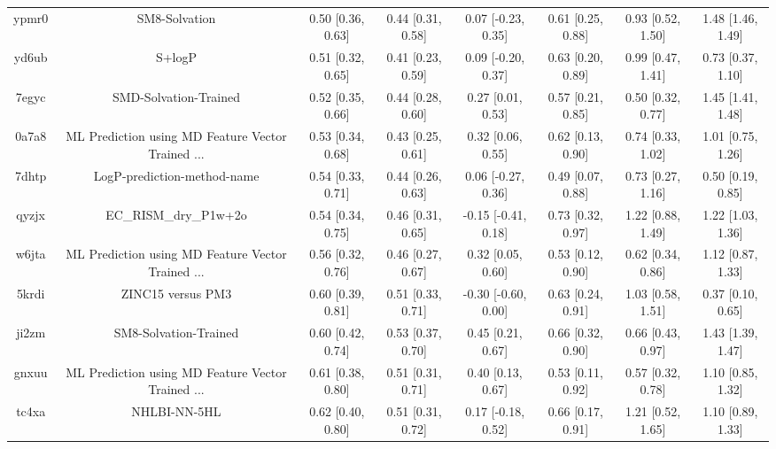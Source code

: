 \documentclass{article}
\begin{document}
\begin{center}
\begin{longtable}{|cccccccc|}
 ypmr0 &                                      SM8-Solvation &  0.50 [0.36, 0.63] &  0.44 [0.31, 0.58] &    0.07 [-0.23, 0.35] &  0.61 [0.25, 0.88] &    0.93 [0.52, 1.50] &     1.48 [1.46, 1.49] \\
 yd6ub &                                             S+logP &  0.51 [0.32, 0.65] &  0.41 [0.23, 0.59] &    0.09 [-0.20, 0.37] &  0.63 [0.20, 0.89] &    0.99 [0.47, 1.41] &     0.73 [0.37, 1.10] \\
 7egyc &                              SMD-Solvation-Trained &  0.52 [0.35, 0.66] &  0.44 [0.28, 0.60] &     0.27 [0.01, 0.53] &  0.57 [0.21, 0.85] &    0.50 [0.32, 0.77] &     1.45 [1.41, 1.48] \\
 0a7a8 &  ML Prediction using MD Feature Vector Trained ... &  0.53 [0.34, 0.68] &  0.43 [0.25, 0.61] &     0.32 [0.06, 0.55] &  0.62 [0.13, 0.90] &    0.74 [0.33, 1.02] &     1.01 [0.75, 1.26] \\
 7dhtp &                        LogP-prediction-method-name &  0.54 [0.33, 0.71] &  0.44 [0.26, 0.63] &    0.06 [-0.27, 0.36] &  0.49 [0.07, 0.88] &    0.73 [0.27, 1.16] &     0.50 [0.19, 0.85] \\
 qyzjx &                              EC\_RISM\_dry\_P1w+2o &  0.54 [0.34, 0.75] &  0.46 [0.31, 0.65] &   -0.15 [-0.41, 0.18] &  0.73 [0.32, 0.97] &    1.22 [0.88, 1.49] &     1.22 [1.03, 1.36] \\
 w6jta &  ML Prediction using MD Feature Vector Trained ... &  0.56 [0.32, 0.76] &  0.46 [0.27, 0.67] &     0.32 [0.05, 0.60] &  0.53 [0.12, 0.90] &    0.62 [0.34, 0.86] &     1.12 [0.87, 1.33] \\
 5krdi &                                  ZINC15 versus PM3 &  0.60 [0.39, 0.81] &  0.51 [0.33, 0.71] &   -0.30 [-0.60, 0.00] &  0.63 [0.24, 0.91] &    1.03 [0.58, 1.51] &     0.37 [0.10, 0.65] \\
 ji2zm &                              SM8-Solvation-Trained &  0.60 [0.42, 0.74] &  0.53 [0.37, 0.70] &     0.45 [0.21, 0.67] &  0.66 [0.32, 0.90] &    0.66 [0.43, 0.97] &     1.43 [1.39, 1.47] \\
 gnxuu &  ML Prediction using MD Feature Vector Trained ... &  0.61 [0.38, 0.80] &  0.51 [0.31, 0.71] &     0.40 [0.13, 0.67] &  0.53 [0.11, 0.92] &    0.57 [0.32, 0.78] &     1.10 [0.85, 1.32] \\
 tc4xa &                                       NHLBI-NN-5HL &  0.62 [0.40, 0.80] &  0.51 [0.31, 0.72] &    0.17 [-0.18, 0.52] &  0.66 [0.17, 0.91] &    1.21 [0.52, 1.65] &     1.10 [0.89, 1.33] \\

\end{longtable}
\end{center}
\end{document}
